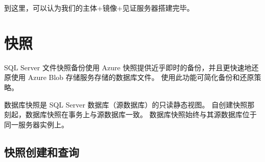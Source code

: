 \documentclass[onecolumn,oneside]{BUPTHomework}
\begin{document}
  到这里，可以认为我们的主体+镜像+见证服务器搭建完毕。

  \section{快照}

  SQL Server 文件快照备份使用 Azure 快照提供近乎即时的备份，并且更快速地还原使用 Azure Blob 存储服务存储的数据库文件。
  使用此功能可简化备份和还原策略。

  数据库快照是 SQL Server 数据库（源数据库）的只读静态视图。 
  自创建快照那刻起，数据库快照在事务上与源数据库一致。 
  数据库快照始终与其源数据库位于同一服务器实例上。 

  \subsection{快照创建和查询}
\end{document}
